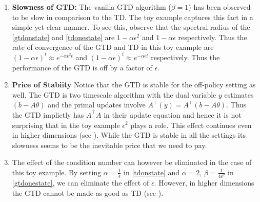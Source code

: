 \begin{table}
\end{table}
\begin{enumerate}[leftmargin=*]
\item \textbf{Slowness of GTD:} The vanilla GTD algorithm ($\beta=1$) has been observed to be slow in comparison to the TD. The toy example captures this fact in a simple yet clear manner. To see this, observe that the spectral radius of the \eqref{gtdonstate} and \eqref{tdonestate} are $1-\alpha\epsilon^2$ and $1-\alpha\epsilon$ respectively. Thus the rate of convergence of the GTD  and TD in this toy example are $(1-\alpha\epsilon)^t\approx e^{-\alpha\epsilon^2 t}$ and $(1-\alpha\epsilon)^t\approx e^{-\alpha\epsilon t}$ respectively. Thus the performance of the GTD is off by a factor of $\epsilon$.
\item \textbf{Price of Stabiity} Notice that the GTD is stable for the off-policy setting as well. The GTD is two timescale algorithm with the dual variable $y$ estimates $(b-A\theta)$ and the primal updates involve $A^\top(y)=A^\top(b-A\theta)$. Thus the GTD implictly has $A^\top A$ in their update equation and hence it is not surprising that in the toy example $\epsilon^2$ plays a role. This effect continues even in higher dimensions (see ). While the GTD is stable in all the settings its slowness seems to be the inevitable price that we need to pay.
\item The effect of the condition number can however be eliminated in the case of this toy example. By setting $\alpha=\frac{1}{\epsilon}$ in \eqref{tdonstate} and $\alpha=2$, $\beta=\frac{1}{4\epsilon^2}$ in \eqref{gtdonestate}, we can eliminate the effect of $\epsilon$. However, in higher dimensions the GTD cannot be made as good as TD (see \Cref{}).
\end{enumerate}
